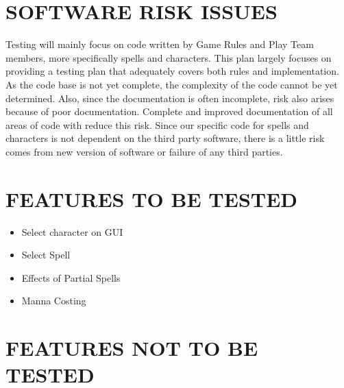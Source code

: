 {\section[SOFTWARE RISK ISSUES]{\bfseries\color{black} SOFTWARE RISK ISSUES}
{\color{black}

Testing will mainly focus on code written by Game Rules and Play Team members, more specifically spells and characters. This plan largely focuses on providing a testing plan that adequately covers both rules and implementation.
As the code base is not yet complete, the complexity of the code cannot be yet determined. Also, since the documentation is often incomplete, risk also arises because of poor documentation. Complete and improved documentation of all areas of code with reduce this risk. Since our specific code for spells and characters is not dependent on the third party software, there is a little risk comes from new version of software or failure of any third parties. 

}

\section[FEATURES TO BE TESTED]{\bfseries\color{black} FEATURES TO BE TESTED}
{\color{black}

\begin{itemize}
\item Select character on GUI
\item Select Spell
\item Effects of Partial Spells
\item Manna Costing
\end{itemize}

}

\section[FEATURES NOT TO BE TESTED]{\bfseries\color{black}
	 FEATURES NOT TO BE TESTED}


}
